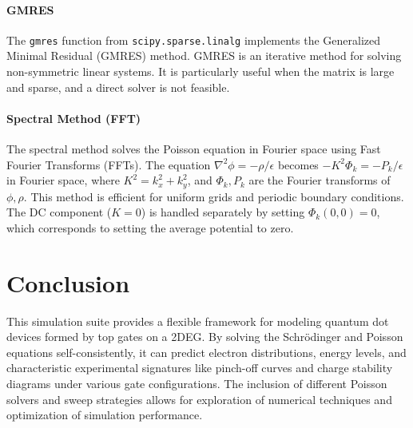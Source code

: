 \documentclass{article}
\begin{document}
\paragraph{GMRES}
The \texttt{gmres} function from \texttt{scipy.sparse.linalg} implements the Generalized Minimal Residual (GMRES) method. GMRES is an iterative method for solving non-symmetric linear systems. It is particularly useful when the matrix is large and sparse, and a direct solver is not feasible.

\paragraph{Spectral Method (FFT)}
The spectral method solves the Poisson equation in Fourier space using Fast Fourier Transforms (FFTs). The equation \(\nabla^2 \phi = -\rho/\epsilon\) becomes \(-K^2 \Phi_k = -P_k/\epsilon\) in Fourier space, where \(K^2 = k_x^2 + k_y^2\), and \(\Phi_k, P_k\) are the Fourier transforms of \(\phi, \rho\). This method is efficient for uniform grids and periodic boundary conditions. The DC component (\(K=0\)) is handled separately by setting \(\Phi_k(0,0)=0\), which corresponds to setting the average potential to zero.

\section{Conclusion}
This simulation suite provides a flexible framework for modeling quantum dot devices formed by top gates on a 2DEG. By solving the Schrödinger and Poisson equations self-consistently, it can predict electron distributions, energy levels, and characteristic experimental signatures like pinch-off curves and charge stability diagrams under various gate configurations. The inclusion of different Poisson solvers and sweep strategies allows for exploration of numerical techniques and optimization of simulation performance.
\end{document}
